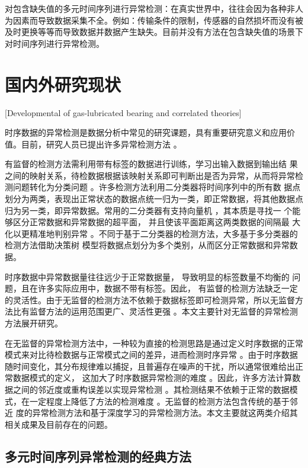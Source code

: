 对包含缺失值的多元时间序列进行异常检测：在真实世界中，往往会因为各种非人为因素而导致数据采集不全。例如：传输条件的限制，传感器的自然损坏而没有被及时更换等等而导致数据并数据产生缺失。目前并没有方法在包含缺失值的场景下对时间序列进行异常检测。

\section{国内外研究现状}[Developmental of gas-lubricated bearing and correlated theories]

时序数据的异常检测是数据分析中常见的研究课题，具有重要研究意义和应用价值。目前，研究人员已提出许多异常检测方法\cite{green10,green11,green12} 。

有监督的检测方法需利用带有标签的数据进行训练，学习出输入数据到输出结 果之间的映射关系，待检数据根据该映射关系即可判断出是否为异常，从而将异常检测问题转化为分类问题\cite{green13,green14} 。许多检测方法利用二分类器将时间序列中的所有数 据点划分为两类，表现出正常状态的数据点统一归为一类，即正常数据，将其他数据点归为另一类，即异常数据。常用的二分类器有支持向量机\cite{green15} ，其本质是寻找一 个能够区分正常数据和异常数据的超平面， 并且使该平面距离这两类数据的间隔最 大化以更精准地判别异常 。不同于基于二分类器的检测方法，大多基于多分类器的检测方法借助决策树\cite{green16} 模型将数据点划分为多个类别，从而区分正常数据和异常数据。

时序数据中异常数据量往往远少于正常数据量， 导致明显的标签数量不均衡的 问题，且在许多实际应用中，数据不带有标签。因此， 有监督的检测方法缺乏一定 的灵活性。由于无监督的检测方法不依赖于数据标签即可检测异常，所以无监督方法比有监督方法的运用范围更广、灵活性更强\cite{green10} 。本文主要针对无监督的异常检测方法展开研究。

在无监督的异常检测方法中，一种较为直接的检测思路是通过定义时序数据的正常模式来对比待检数据与正常模式之间的差异，进而检测时序异常 。由于时序数据随时间变化，其分布规律难以捕捉，且普遍存在噪声的干扰，所以通常很难给出正常数据模式的定义， 这加大了时序数据异常检测的难度\cite{green18} 。因此，许多方法计算数据之间的邻近度或重构误差以实现异常检测 。其检测结果不依赖于正常的数据模式，在一定程度上降低了方法的检测难度 。无监督的检测方法包含传统的基于邻近 度的异常检测方法和基于深度学习的异常检测方法。本文主要就这两类介绍其相关成果及目前存在的问题。

\subsection{多元时间序列异常检测的经典方法}

